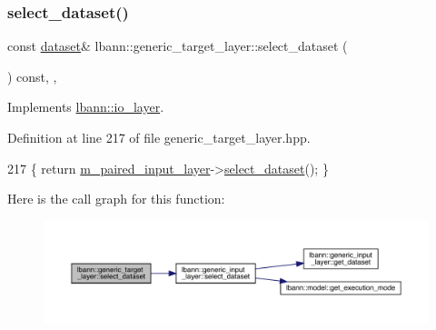 \subsubsection{\texorpdfstring{select\+\_\+dataset()}{select\_dataset()}\hspace{0.1cm}{\footnotesize\ttfamily [2/2]}}
{\footnotesize\ttfamily const \hyperlink{classlbann_1_1dataset}{dataset}\& lbann\+::generic\+\_\+target\+\_\+layer\+::select\+\_\+dataset (\begin{DoxyParamCaption}{ }\end{DoxyParamCaption}) const\hspace{0.3cm}{\ttfamily [inline]}, {\ttfamily [override]}, {\ttfamily [virtual]}}



Implements \hyperlink{classlbann_1_1io__layer_abbbeb6ca3e1d95b5c35dd9bb499bdd2d}{lbann\+::io\+\_\+layer}.



Definition at line 217 of file generic\+\_\+target\+\_\+layer.\+hpp.


\begin{DoxyCode}
217 \{ \textcolor{keywordflow}{return} \hyperlink{classlbann_1_1generic__target__layer_a84da1260e9feb4fbc3e6f2315e4cab4b}{m\_paired\_input\_layer}->\hyperlink{classlbann_1_1generic__input__layer_a654365ee97a64c75a547cfb7ef329304}{select\_dataset}(); \}
\end{DoxyCode}
Here is the call graph for this function\+:\nopagebreak
\begin{figure}[H]
\begin{center}
\leavevmode
\includegraphics[width=350pt]{classlbann_1_1generic__target__layer_ac83761609177fc272fa9c2fe098d4676_cgraph}
\end{center}
\end{figure}
\mbox{\label{classlbann_1_1generic__target__layer_a22374687112c04dd6e0e35b94fe0e46c}} 
